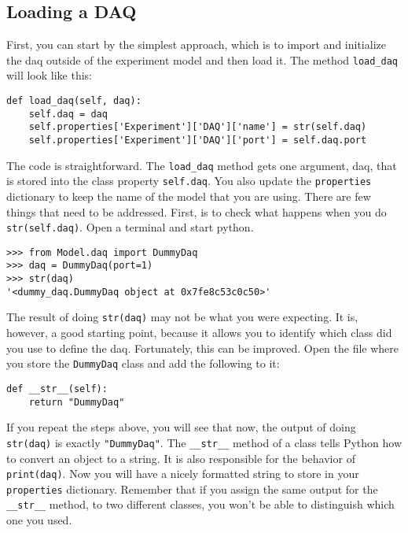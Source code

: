 \subsection{Loading a DAQ}\label{loading-a-daq}

First, you can start by the simplest approach, which is to import and
initialize the daq outside of the experiment model and then load it. The
method \texttt{load_daq} will look like this:

\begin{verbatim}
def load_daq(self, daq):
    self.daq = daq
    self.properties['Experiment']['DAQ']['name'] = str(self.daq)
    self.properties['Experiment']['DAQ']['port'] = self.daq.port
\end{verbatim}

The code is straightforward. The \texttt{load_daq} method gets one
argument, daq, that is stored into the class property \texttt{self.daq}.
You also update the \texttt{properties} dictionary to keep the name of
the model that you are using. There are few things that need to be
addressed. First, is to check what happens when you do
\texttt{str(self.daq)}. Open a terminal and start python.

\begin{verbatim}
>>> from Model.daq import DummyDaq
>>> daq = DummyDaq(port=1)
>>> str(daq)
'<dummy_daq.DummyDaq object at 0x7fe8c53c0c50>'
\end{verbatim}

The result of doing \texttt{str(daq)} may not be what you were
expecting. It is, however, a good starting point, because it allows you
to identify which class did you use to define the daq. Fortunately, this
can be improved. Open the file where you store the \texttt{DummyDaq}
class and add the following to it:

\begin{verbatim}
def __str__(self):
    return "DummyDaq"
\end{verbatim}

If you repeat the steps above, you will see that now, the output of
doing \texttt{str(daq)} is exactly \texttt{"DummyDaq"}. The
\texttt{__str__} method of a class tells Python how to convert an
object to a string. It is also responsible for the behavior of
\texttt{print(daq)}. Now you will have a nicely formatted string to
store in your \texttt{properties} dictionary. Remember that if you
assign the same output for the \texttt{__str__} method, to two
different classes, you won't be able to distinguish which one you used.


